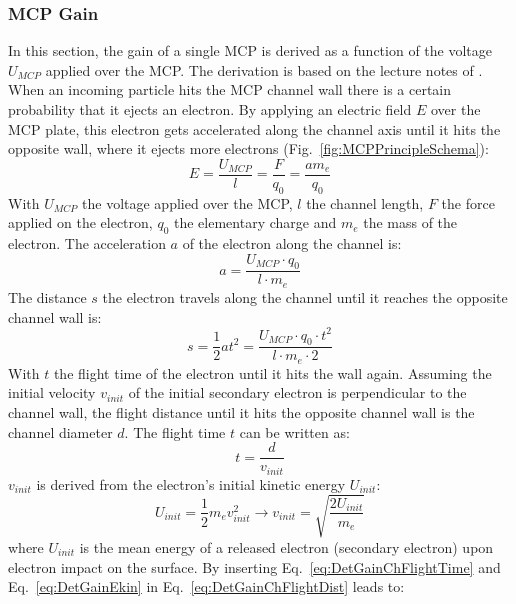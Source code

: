 	\subsubsection{MCP Gain}\label{chap:MCPGain}
	In this section, the gain of a single MCP is derived as a function of the voltage $U_{MCP}$ applied over the MCP. The derivation is based on the lecture notes of \cite{LecNot_Wurz2017}. When an incoming particle hits the MCP channel wall there is a certain probability that it ejects an electron. By applying an electric field $E$ over the MCP plate, this electron gets accelerated along the channel axis until it hits the opposite wall, where it ejects more electrons (Fig.~\ref{fig:MCPPrincipleSchema}):
	\begin{equation}
		E = \frac{U_{MCP}}{l} = \frac{F}{q_0} = \frac{a m_e}{q_0}
	\end{equation}
	With $U_{MCP}$ the voltage applied over the MCP, $l$ the channel length, $F$ the force applied on the electron, $q_0$ the elementary charge and $m_e$ the mass of the electron. The acceleration $a$ of the electron along the channel is:		
	\begin{equation}
		a = \frac{U_{MCP}\cdot q_0}{l\cdot m_e}
	\end{equation}
	The distance $s$ the electron travels along the channel until it reaches the opposite channel wall is:
	\begin{equation}
		s = \frac{1}{2}at^2 = \frac{U_{MCP}\cdot q_0\cdot t^2}{l\cdot m_e\cdot 2}
		\label{eq:DetGainChFlightDist}
	\end{equation}
	With $t$ the flight time of the electron until it hits the wall again. Assuming the initial velocity $v_{init}$ of the initial secondary electron is perpendicular to the channel wall, the flight distance until it hits the opposite channel wall is the channel diameter $d$. The flight time $t$ can be written as:
	\begin{equation}
		t = \frac{d}{v_{init}}
		\label{eq:DetGainChFlightTime}
	\end{equation}
	$v_{init}$ is derived from the electron's initial kinetic energy $U_{init}$:
	\begin{equation}
		U_{init} = \frac{1}{2}m_e v_{init}^2 \rightarrow v_{init} = \sqrt{\frac{2U_{init}}{m_e}}
		\label{eq:DetGainEkin}
	\end{equation}
	where $U_{init}$ is the mean energy of a released electron (secondary electron) upon electron impact on the surface. By inserting Eq.~\eqref{eq:DetGainChFlightTime} and Eq.~\eqref{eq:DetGainEkin} in Eq.~\eqref{eq:DetGainChFlightDist} leads to:
